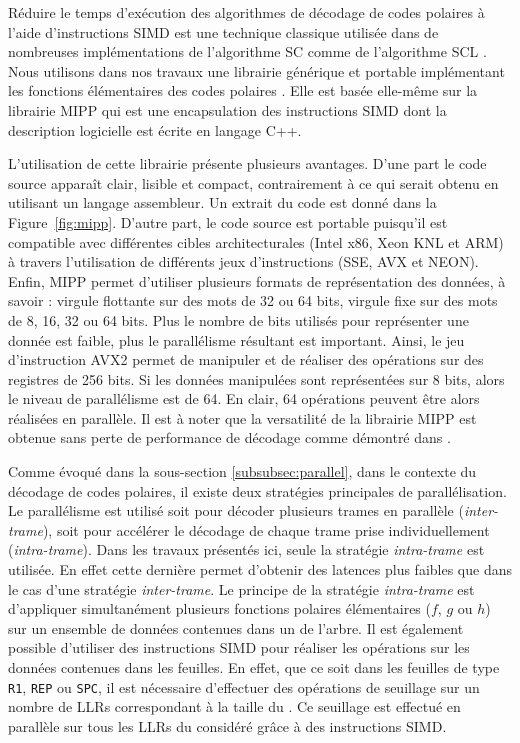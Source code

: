 Réduire le temps d'exécution des algorithmes de décodage de codes polaires à l'aide d'instructions SIMD est une technique classique utilisée dans de nombreuses implémentations de l'algorithme SC \cite{sarkis_fast_2014,giard_fast_2014,giard_low-latency_2016,sarkis_autogenerating_2014,gal_software_2014,cassagne_efficient_2015,cassagne_energy_2016,gal_multi-gb/s_2015} comme de l'algorithme SCL \cite{sarkis_fast_2016,sarkis_increasing_2014,shen_low-latency_2016}. Nous utilisons dans nos travaux une librairie générique et portable implémentant les fonctions élémentaires des codes polaires \cite{cassagne_efficient_2015}. Elle est basée elle-même sur la librairie MIPP \cite{cassagne2018mipp} qui est une encapsulation des instructions SIMD dont la description logicielle est écrite en langage C++.

L'utilisation de cette librairie présente plusieurs avantages. D'une part le code source apparaît clair, lisible et compact, contrairement à ce qui serait obtenu en utilisant un langage assembleur. Un extrait du code est donné dans la Figure~\ref{fig:mipp}. D'autre part, le code source est portable puisqu'il est compatible avec différentes cibles architecturales (Intel x86, Xeon KNL et ARM) à travers l'utilisation de différents jeux d'instructions (SSE, AVX et NEON). Enfin, MIPP permet d'utiliser plusieurs formats de représentation des données, à savoir : virgule flottante sur des mots de 32 ou 64 bits, virgule fixe sur des mots de 8, 16, 32 ou 64 bits. Plus le nombre de bits utilisés pour représenter une donnée est faible, plus le parallélisme résultant est important. Ainsi, le jeu d'instruction AVX2 permet de manipuler et de réaliser des opérations sur des registres de 256 bits. Si les données manipulées sont représentées sur 8 bits, alors le niveau de parallélisme est de 64. En clair, 64 opérations peuvent être alors réalisées en parallèle. Il est à noter que la versatilité de la librairie MIPP est obtenue sans perte de performance de décodage comme démontré dans \cite{cassagne2018mipp}.

Comme évoqué dans la sous-section \ref{subsubsec:parallel}, dans le contexte du décodage de codes polaires, il existe deux stratégies principales de parallélisation. Le parallélisme est utilisé soit pour décoder plusieurs trames en parallèle (\textit{inter-trame}), soit pour accélérer le décodage de chaque trame prise individuellement (\textit{intra-trame}). Dans les travaux présentés ici, seule la stratégie \textit{intra-trame} est utilisée. En effet cette dernière permet d'obtenir des latences plus faibles que dans le cas d'une stratégie \textit{inter-trame}. Le principe de la stratégie \textit{intra-trame} est d'appliquer simultanément plusieurs fonctions polaires élémentaires ($f$, $g$ ou $h$) sur un ensemble de données contenues dans un \noeud de l'arbre. Il est également possible d'utiliser des instructions SIMD pour réaliser les opérations sur les données contenues dans les feuilles. En effet, que ce soit dans les feuilles de type \texttt{R1}, \texttt{REP} ou \texttt{SPC}, il est nécessaire d'effectuer des opérations de seuillage sur un nombre de LLRs correspondant à la taille du \noeud. Ce seuillage est effectué en parallèle sur tous les LLRs du \noeud considéré grâce à des instructions SIMD.


